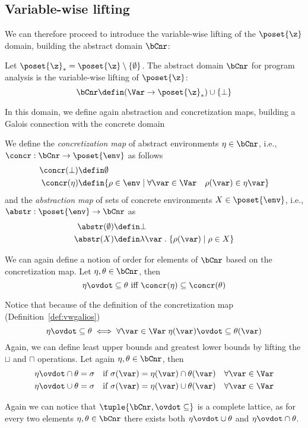 \subsection{Variable-wise lifting}\label{sub:vwnonrel}

We can therefore proceed to introduce the variable-wise lifting of the
\(\poset{\z}\) domain, building the abstract domain \(\bCnr\):

\begin{definition}
  Let \(\poset{\z}_* = \poset{\z} \setminus \{\emptyset\}\). The
  abstract domain \(\bCnr\) for program analysis is the variable-wise
  lifting of \(\poset{\z}\):
  \[ \bCnr \defin (\Var \to \poset{\z}_*) \cup \{ \bot \} \]
\end{definition}

In this domain, we define again abstraction and concretization maps,
building a Galois connection with the concrete domain

\begin{definition}\label{def:vwgalios}
  We define the \emph{concretization map} of abstract environments
  \(\eta \in \bCnr\), i.e., \({\concr : \bCnr \to \poset{\env}}\) as
  follows
  \begin{align*}
    \concr(\bot) & \defin \emptyset \\
    \concr(\eta) & \defin \{\rho \in \env \mid \forall \var \in \Var \quad \rho(\var) \in \eta\var\}
  \end{align*}
  and the \emph{abstraction map} of sets of concrete environments
  \(X \in \poset{\env}\), i.e., \(\abstr : \poset{\env} \to \bCnr\) as
  \begin{align*}
    \abstr(\emptyset) & \defin \bot \\
    \abstr(X) & \defin \lambda \var \; . \; \{\rho(\var) \mid \rho \in X\}
  \end{align*}
\end{definition}

We can again define a notion of order for elements of \(\bCnr\) based
on the concretization map. Let \(\eta, \theta \in \bCnr\), then
\begin{equation*}
  \eta \ovdot\subseteq \theta \text{ iff } \concr(\eta) \subseteq \concr(\theta)
\end{equation*}

Notice that because of the definition of the concretization map
(Definition~\ref{def:vwgalios})
\begin{equation*}
  \eta \ovdot\subseteq \theta \iff \forall \var \in \Var \; \eta(\var) \ovdot\subseteq \theta(\var)
\end{equation*}
Again, we can define least upper bounds and greatest lower bounds by
lifting the \(\sqcup\) and \(\sqcap\) operations. Let again
\(\eta, \theta \in \bCnr\), then
\begin{align*}
  \eta \ovdot\cap \theta = \sigma & \quad \text{if } \sigma(\var) = \eta(\var) \cap \theta(\var) \quad \forall \var\in\Var \\
  \eta \ovdot\cup \theta = \sigma & \quad \text{if } \sigma(\var) = \eta(\var) \cup \theta(\var) \quad \forall \var\in\Var
\end{align*}

Again we can notice that \(\tuple{\bCnr, \ovdot\subseteq}\) is a
complete lattice, as for every two elements \(\eta,\theta\in\bCnr\)
there exists both \(\eta \ovdot\cup \theta\) and
\(\eta \ovdot\cap \theta\).
